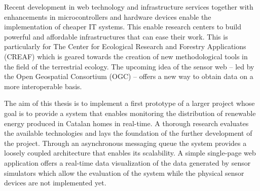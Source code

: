 % 
% 
%

Recent development in web technology and infrastructure services together with enhancements in microcontrollers and hardware devices enable the implementation of cheaper IT systems. This enable research centers to build powerful and affordable infrastructures that can ease their work. This is particularly for The Center for Ecological Research and Forestry Applications (CREAF) which is geared towards the creation of new methodological tools in the field of the terrestrial ecology. The upcoming idea of the sensor web -- led by the Open Geospatial Consortium (OGC) -- offers a new way to obtain data on a more interoperable basis.

The aim of this thesis is to implement a first prototype of a larger project whose goal is to provide a system that enables monitoring the distribution of renewable energy produced in Catalan homes in real-time. A thorough research evaluates the available technologies and lays the foundation of the further development of the project. Through an asynchronous messaging queue the system provides a loosely coupled architecture that enables its scalability. A simple single-page web application offers a real-time data visualization of the data generated by sensor simulators which allow the evaluation of the system while the physical sensor devices are not implemented yet.
